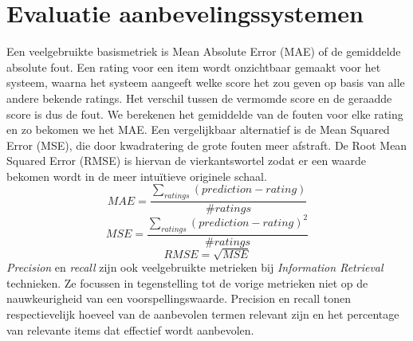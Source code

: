 \section{Evaluatie aanbevelingssystemen}
Een veelgebruikte basismetriek is Mean Absolute Error (MAE) of de gemiddelde absolute fout. Een rating voor een item wordt onzichtbaar gemaakt voor het systeem, waarna het systeem aangeeft welke score het zou geven op basis van alle andere bekende ratings. Het verschil tussen de vermomde score en de geraadde score is dus de fout. We berekenen het gemiddelde van de fouten voor elke rating en zo bekomen we het MAE. Een vergelijkbaar alternatief is de Mean Squared Error (MSE), die door kwadratering de grote fouten meer afstraft. De Root Mean Squared Error (RMSE) is hiervan de vierkantswortel zodat er een waarde bekomen wordt in de meer intu\"itieve originele schaal.
\begin{equation}
MAE = \frac{\sum_{ratings} (prediction - rating)}{\#ratings}
\end{equation}
\begin{equation}MSE = \frac{\sum_{ratings} (prediction - rating)^2}{\#ratings}
\end{equation}
\begin{equation}
RMSE = \sqrt{MSE}
\end{equation}
\textit{Precision} en \emph{recall} zijn ook veelgebruikte metrieken bij \emph{Information Retrieval} technieken. Ze focussen in tegenstelling tot de vorige metrieken niet op de nauwkeurigheid van een voorspellingswaarde. Precision en recall tonen respectievelijk hoeveel van de aanbevolen termen relevant zijn en het percentage van relevante items dat effectief wordt aanbevolen.




